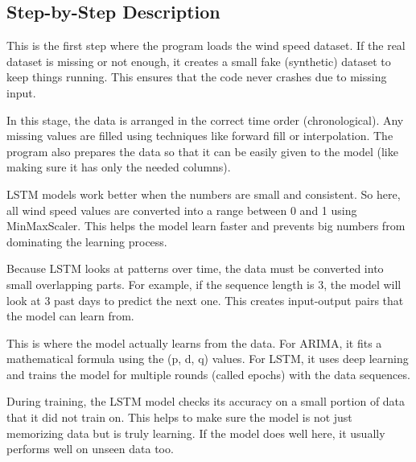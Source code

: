 \subsection*{Step-by-Step Description}

\begin{description}[style=nextline,leftmargin=1.5cm]
	\item[\textbf{1. Data Ingestion}]
	This is the first step where the program loads the wind speed dataset. If the real dataset is missing or not enough, it creates a small fake (synthetic) dataset to keep things running. This ensures that the code never crashes due to missing input.
	\item[\textbf{2. Data Preprocessing}]
	In this stage, the data is arranged in the correct time order (chronological). Any missing values are filled using techniques like forward fill or interpolation. The program also prepares the data so that it can be easily given to the model (like making sure it has only the needed columns).
	
	\item[\textbf{3. Feature Scaling (LSTM only)}]
	LSTM models work better when the numbers are small and consistent. So here, all wind speed values are converted into a range between 0 and 1 using MinMaxScaler. This helps the model learn faster and prevents big numbers from dominating the learning process.
	
	\item[\textbf{4. Sequence Generation (LSTM only)}]
	Because LSTM looks at patterns over time, the data must be converted into small overlapping parts. For example, if the sequence length is 3, the model will look at 3 past days to predict the next one. This creates input-output pairs that the model can learn from.
	
	\item[\textbf{5. Model Training}]
	This is where the model actually learns from the data. For ARIMA, it fits a mathematical formula using the (p, d, q) values. For LSTM, it uses deep learning and trains the model for multiple rounds (called epochs) with the data sequences.
	
	\item[\textbf{6. Model Validation (LSTM)}]
	During training, the LSTM model checks its accuracy on a small portion of data that it did not train on. This helps to make sure the model is not just memorizing data but is truly learning. If the model does well here, it usually performs well on unseen data too.
	

\end{description}
